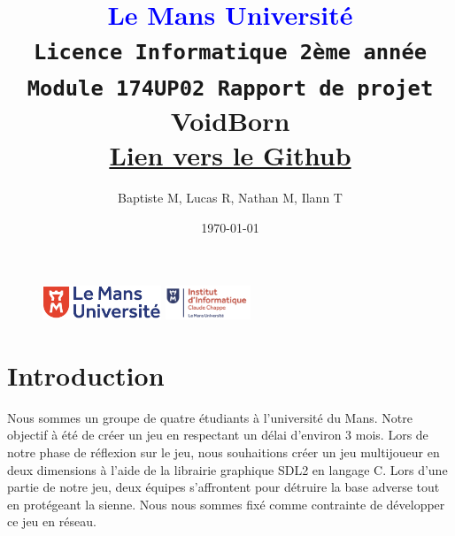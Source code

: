 \documentclass[11pt]{article}
\begin{document}
\begin{figure}
    \includegraphics[height=1cm]{logolemansU.png}
    \hfill
    \includegraphics[height=1cm]{logo_IC2.png}
\end{figure}
    \title { 
        \textcolor{blue}{Le Mans Université} \\
        \texttt{Licence Informatique 2ème année} \\
        \texttt{Module 174UP02 Rapport de projet}\\
        \textbf{VoidBorn}\\
        \href{https://github.com/Herebios/projet}{Lien vers le Github}
    }
    
    \author{Baptiste M, Lucas R, Nathan M, Ilann T} 
    \date{\today} 
    \maketitle

    \newpage
    \tableofcontents
    \newpage
    
    \section{Introduction}
    Nous sommes un groupe de quatre étudiants à l’université du Mans. Notre objectif à été de créer un jeu en respectant un délai d'environ 3 mois.
    Lors de notre phase de réflexion sur le jeu, nous souhaitions créer un jeu multijoueur en deux dimensions à l'aide de la librairie graphique SDL2 en langage C. 
    Lors d’une partie de notre jeu, deux équipes s'affrontent pour détruire la base adverse tout en protégeant la sienne. 
    Nous nous sommes fixé comme contrainte de développer ce jeu en réseau.
\end{document}
